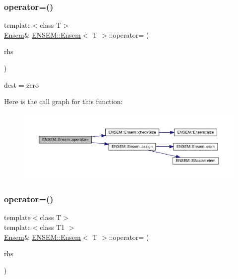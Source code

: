 \subsubsection{\texorpdfstring{operator=()}{operator=()}\hspace{0.1cm}{\footnotesize\ttfamily [6/15]}}
{\footnotesize\ttfamily template$<$class T$>$ \\
\mbox{\hyperlink{classENSEM_1_1Ensem}{Ensem}}\& \mbox{\hyperlink{classENSEM_1_1Ensem}{E\+N\+S\+E\+M\+::\+Ensem}}$<$ T $>$\+::operator= (\begin{DoxyParamCaption}\item[{const \mbox{\hyperlink{structENSEM_1_1Zero}{Zero}} \&}]{rhs }\end{DoxyParamCaption})\hspace{0.3cm}{\ttfamily [inline]}}



dest = zero 

Here is the call graph for this function\+:
\nopagebreak
\begin{figure}[H]
\begin{center}
\leavevmode
\includegraphics[width=350pt]{d7/d3e/classENSEM_1_1Ensem_a55913bc59bca1022f5189cbc86632c11_cgraph}
\end{center}
\end{figure}
\mbox{\label{classENSEM_1_1Ensem_a376ab0239198595a09384c13d7a1ad1c}} 
\subsubsection{\texorpdfstring{operator=()}{operator=()}\hspace{0.1cm}{\footnotesize\ttfamily [7/15]}}
{\footnotesize\ttfamily template$<$class T$>$ \\
template$<$class T1 $>$ \\
\mbox{\hyperlink{classENSEM_1_1Ensem}{Ensem}}\& \mbox{\hyperlink{classENSEM_1_1Ensem}{E\+N\+S\+E\+M\+::\+Ensem}}$<$ T $>$\+::operator= (\begin{DoxyParamCaption}\item[{const \mbox{\hyperlink{classENSEM_1_1EScalar}{E\+Scalar}}$<$ T1 $>$ \&}]{rhs }\end{DoxyParamCaption})\hspace{0.3cm}{\ttfamily [inline]}}



